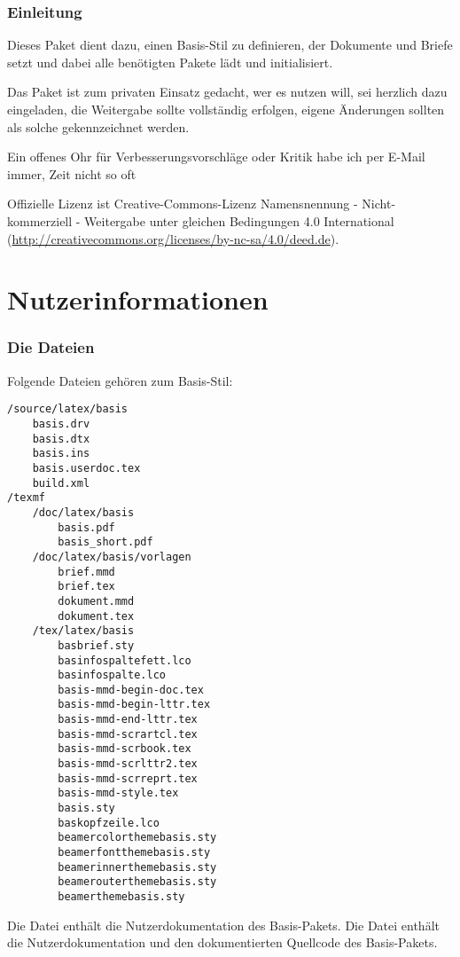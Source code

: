 
\section{Einleitung}

Dieses Paket dient dazu, einen Basis-Stil zu definieren, der Dokumente und Briefe setzt und dabei alle benötigten Pakete lädt und initialisiert.

Das Paket ist zum privaten Einsatz gedacht, wer es nutzen will, sei herzlich dazu eingeladen, die Weitergabe sollte vollständig erfolgen, eigene Änderungen sollten als solche gekennzeichnet werden.

Ein offenes Ohr für Verbesserungsvorschläge oder Kritik habe ich per E-Mail immer, Zeit nicht so oft \smiley

Offizielle Lizenz ist Creative-Commons-Lizenz Namensnennung - Nicht-kommerziell - Weitergabe unter gleichen Bedingungen 4.0 International (\url{http://creativecommons.org/licenses/by-nc-sa/4.0/deed.de}).


\cleardoublepage
\thispagestyle{BASfuss}
\part{Nutzerinformationen}
\cleardoublepage


\section{Die Dateien}
\label{sec:Dateien}

Folgende Dateien gehören zum Basis-Stil:
{\small
\begin{verbatim}
/source/latex/basis
	basis.drv
	basis.dtx
	basis.ins
	basis.userdoc.tex
	build.xml
/texmf
	/doc/latex/basis
		basis.pdf
		basis_short.pdf
	/doc/latex/basis/vorlagen
		brief.mmd
		brief.tex
		dokument.mmd
		dokument.tex
	/tex/latex/basis
		basbrief.sty
		basinfospaltefett.lco
		basinfospalte.lco
		basis-mmd-begin-doc.tex
		basis-mmd-begin-lttr.tex
		basis-mmd-end-lttr.tex
		basis-mmd-scrartcl.tex
		basis-mmd-scrbook.tex
		basis-mmd-scrlttr2.tex
		basis-mmd-scrreprt.tex
		basis-mmd-style.tex
		basis.sty
		baskopfzeile.lco
		beamercolorthemebasis.sty
		beamerfontthemebasis.sty
		beamerinnerthemebasis.sty
		beamerouterthemebasis.sty
		beamerthemebasis.sty
\end{verbatim}
}


Die Datei  enthält die Nutzerdokumentation des Basis-Pakets.
Die Datei  enthält die Nutzerdokumentation und den dokumentierten Quellcode des Basis-Pakets.


